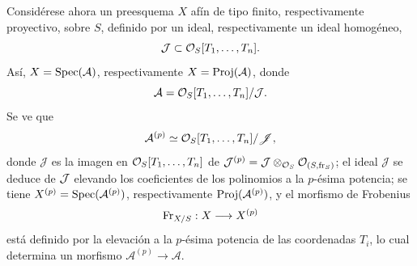 Considérese ahora un preesquema $X$ afín de tipo finito, respectivamente proyectivo, sobre $S$, definido por un ideal, respectivamente un ideal homogéneo,
\[
\mathcal J\subset \mathcal{O}_S[T_1,\ldots,T_n].
\]
Así, $X=\operatorname{Spec}(\mathcal{A})$, respectivamente $X=\operatorname{Proj}(\mathcal{A})$, donde
\[
\mathcal{A}=\mathcal{O}_S[T_1,\ldots,T_n]/\mathcal J.
\]
Se ve que
\[
\mathcal{A}^{(p)}\simeq \mathcal{O}_S[T_1,\ldots,T_n]/\mathscr{J},
\]
donde $\mathscr{J}$ es la imagen en $\mathcal{O}_S[T_1,\ldots,T_n]$ de $\mathcal J^{(p)}=\mathcal J\otimes_{\mathcal{O}_S}\mathcal{O}_{(S,\operatorname{fr}_S)}$; el ideal $\mathscr{J}$ se deduce de $\mathcal J$ elevando los coeficientes de los polinomios a la $p$-ésima potencia; se tiene $X^{(p)}=\operatorname{Spec}(\mathcal{A}^{(p)})$, respectivamente $\operatorname{Proj}(\mathcal{A}^{(p)})$, y el morfismo de Frobenius
\[
\operatorname{Fr}_{X/S}:X\longrightarrow X^{(p)}
\]
está definido por la elevación a la $p$-ésima potencia de las coordenadas $T_i$, lo cual determina un morfismo $\mathcal{A}^{(p)}\to\mathcal{A}$.
